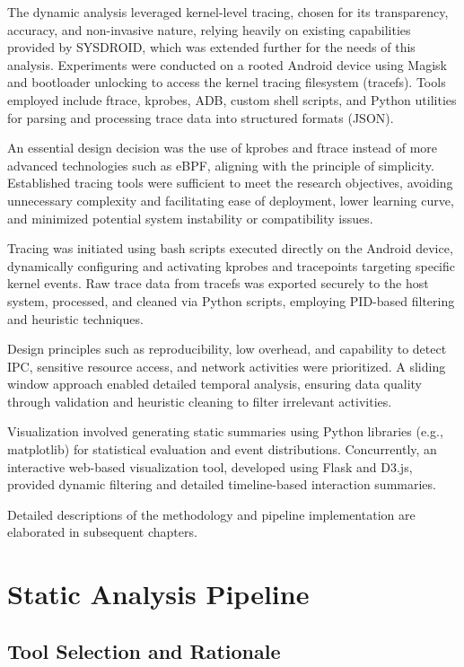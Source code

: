 \documentclass[a4paper,12pt]{report}
\begin{document}
The dynamic analysis leveraged kernel-level tracing, chosen for its transparency, accuracy, and non-invasive nature, relying heavily on existing capabilities provided by SYSDROID, which was extended further for the needs of this analysis. Experiments were conducted on a rooted Android device using Magisk and bootloader unlocking to access the kernel tracing filesystem (tracefs). Tools employed include ftrace, kprobes, ADB, custom shell scripts, and Python utilities for parsing and processing trace data into structured formats (JSON).

An essential design decision was the use of kprobes and ftrace instead of more advanced technologies such as eBPF, aligning with the principle of simplicity. Established tracing tools were sufficient to meet the research objectives, avoiding unnecessary complexity and facilitating ease of deployment, lower learning curve, and minimized potential system instability or compatibility issues.

Tracing was initiated using bash scripts executed directly on the Android device, dynamically configuring and activating kprobes and tracepoints targeting specific kernel events. Raw trace data from tracefs was exported securely to the host system, processed, and cleaned via Python scripts, employing PID-based filtering and heuristic techniques.

Design principles such as reproducibility, low overhead, and capability to detect IPC, sensitive resource access, and network activities were prioritized. A sliding window approach enabled detailed temporal analysis, ensuring data quality through validation and heuristic cleaning to filter irrelevant activities.

Visualization involved generating static summaries using Python libraries (e.g., matplotlib) for statistical evaluation and event distributions. Concurrently, an interactive web-based visualization tool, developed using Flask and D3.js, provided dynamic filtering and detailed timeline-based interaction summaries.

Detailed descriptions of the methodology and pipeline implementation are elaborated in subsequent chapters.


\section{Static Analysis Pipeline}

\subsection{Tool Selection and Rationale}
\end{document}
